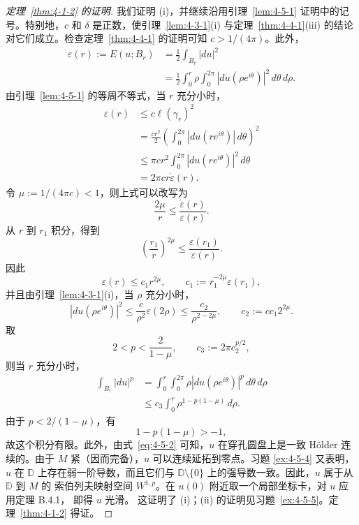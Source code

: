 \begin{proof}[定理~\ref{thm:4-1-2} 的证明]
我们证明 (i)，并继续沿用引理~\ref{lem:4-5-1} 证明中的记号。特别地，$c$ 和
$\delta$ 是正数，使引理~\ref{lem:4-3-1}(i) 与定理~\ref{thm:4-4-1}(iii) 的结论
对它们成立。检查定理~\ref{thm:4-4-1} 的证明可知 $c>1/(4\pi)$。此外，
\[
  \begin{aligned}
  \varepsilon(r):=E(u;B_r)
  &=\frac12\int_{B_r}|du|^2\\
  &=\frac12\int_0^r\rho\int_0^{2\pi}
    |du(\rho e^{i\theta})|^2\,d\theta\,d\rho.
  \end{aligned}
\]
由引理~\ref{lem:4-5-1} 的等周不等式，当 $r$ 充分小时，
\[
  \begin{aligned}
  \varepsilon(r)
  &\le c\ell(\gamma_r)^2\\
  &=\frac{cr^2}{2}
    \left(\int_0^{2\pi}|du(re^{i\theta})|\,d\theta\right)^2\\
  &\le\pi cr^2\int_0^{2\pi}|du(re^{i\theta})|^2\,d\theta\\
  &=2\pi cr\dot\varepsilon(r).
  \end{aligned}
\]
令 $\mu:=1/(4\pi c)<1$，则上式可以改写为
\[
  \frac{2\mu}{r}\le\frac{\dot\varepsilon(r)}{\varepsilon(r)}.
\]
从 $r$ 到 $r_1$ 积分，得到
\[
  \left(\frac{r_1}{r}\right)^{2\mu}
  \le\frac{\varepsilon(r_1)}{\varepsilon(r)}.
\]
因此
\[
  \varepsilon(r)\le c_1r^{2\mu},
  \qquad c_1:=r_1^{-2\mu}\varepsilon(r_1),
\]
并且由引理~\ref{lem:4-3-1}(i)，当 $\rho$ 充分小时，
\begin{equation}\label{eq:4-5-2}
  |du(\rho e^{i\theta})|^2
  \le\frac c{\rho^2}\varepsilon(2\rho)
  \le\frac{c_2}{\rho^{2-2\mu}},
  \qquad c_2:=cc_1 2^{2\mu}.
\end{equation}
取
\[
  2<p<\frac2{1-\mu},
  \qquad c_3:=2\pi c_2^{p/2},
\]
则当 $r$ 充分小时，
\[
  \begin{aligned}
  \int_{B_r}|du|^p
  &=\int_0^r\int_0^{2\pi}
    \rho|du(\rho e^{i\theta})|^p\,d\theta\,d\rho\\
  &\le c_3\int_0^r\rho^{1-p(1-\mu)}\,d\rho.
  \end{aligned}
\]
由于 $p<2/(1-\mu)$，有
\[
  1-p(1-\mu)>-1,
\]
故这个积分有限。此外，由式~\eqref{eq:4-5-2} 可知，$u$ 在穿孔圆盘上是一致
Hölder 连续的。由于 $M$ 紧（因而完备），$u$ 可以连续延拓到零点。习题
\ref{ex:4-5-4} 又表明，$u$ 在 $\mathbb D$ 上存在弱一阶导数，而且它们与
$\mathbb D\setminus\{0\}$ 上的强导数一致。因此，$u$ 属于从 $\mathbb D$ 到 $M$ 的
索伯列夫映射空间 $W^{1,p}$。在 $u(0)$ 附近取一个局部坐标卡，对 $u$ 应用定理 B.4.1，
即得 $u$ 光滑。
这证明了 (i)；(ii) 的证明见习题~\ref{ex:4-5-5}。定理~\ref{thm:4-1-2} 得证。
\end{proof}

